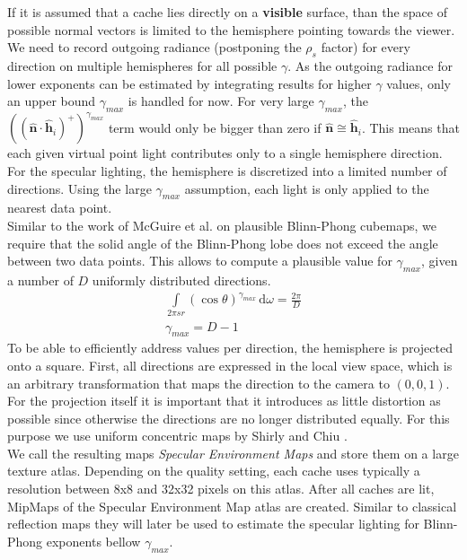 \documentclass[thesis.tex]{subfiles}
\begin{document}
If it is assumed that a cache lies directly on a \textbf{visible} surface, than the space of possible normal vectors is limited to the hemisphere pointing towards the viewer.
We need to record outgoing radiance (postponing the $\rho_s$ factor) for every direction on multiple hemispheres for all possible $\gamma$.
As the outgoing radiance for lower exponents can be estimated by integrating results for higher $\gamma$ values, only an upper bound $\gamma_{max}$ is handled for now.
For very large $\gamma_{max}$, the $((\hat{\mathbf{n}} \cdot \hat{\mathbf{h}}_i)^+)^{\gamma_{max}}$ term would only be bigger than zero if $\hat{\mathbf{n}} \cong \hat{\mathbf{h}}_i$.
This means that each given virtual point light contributes only to a single hemisphere direction.
For the specular lighting, the hemisphere is discretized into a limited number of directions.
Using the large $\gamma_{max}$ assumption, each light is only applied to the nearest data point.\\
%
Similar to the work of McGuire et al. \cite{bib:envmipmap} on plausible Blinn-Phong cubemaps, we require that the solid angle of the Blinn-Phong lobe does not exceed the angle between two data points.
This allows to compute a plausible value for $\gamma_{max}$, given a number of $D$ uniformly distributed directions.
\begin{align}
\int\limits_{2\pi sr} (\cos\theta)^{\gamma_{max}}  \,\mathrm{d}\omega = \frac{2\pi}{D}\\
\gamma_{max} = D-1
\end{align}
%
To be able to efficiently address values per direction, the hemisphere is projected onto a square.
First, all directions are expressed in the local view space, which is an arbitrary transformation that maps the direction to the camera to $(0,0,1)$.
For the projection itself it is important that it introduces as little distortion as possible since otherwise the directions are no longer distributed equally.
For this purpose we use uniform concentric maps by Shirly and Chiu \cite{bib:concentricmaps}.\\ 
We call the resulting maps \emph{Specular Environment Maps} and store them on a large texture atlas.
Depending on the quality setting, each cache uses typically a resolution between 8x8 and 32x32 pixels on this atlas.
After all caches are lit, MipMaps of the Specular Environment Map atlas are created.
Similar to classical reflection maps \cite[p.~308]{bib:RealtimeRenderingBook} they will later be used to estimate the specular lighting for Blinn-Phong exponents bellow $\gamma_{max}$.
\end{document}
